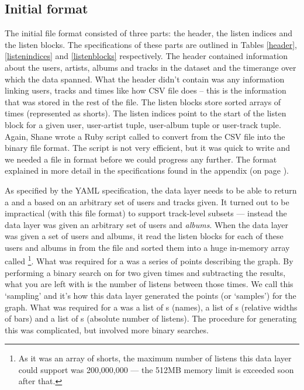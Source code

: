 \subsection{Initial format}
The initial file format consisted of three parts: the header, the listen indices and the listen blocks. The specifications of these parts are outlined in Tables \ref{header}, \ref{listenindices} and \ref{listenblocks} respectively. The header contained information about the users, artists, albums and tracks in the dataset and the timerange over which the data spanned. What the header didn't contain was any information linking users, tracks and times like how CSV file does -- this is the information that was stored in the rest of the file. The listen blocks store sorted arrays of times (represented as shorts). The listen indices point to the start of the listen block for a given user, user-artist tuple, user-album tuple or user-track tuple. Again, Shane wrote a Ruby script called  to convert from the CSV file into the binary file format\cite{bin}. The script is not very efficient, but it was quick to write and we needed a file in  format before we could progress any further. The format explained in more detail in the specifications found in the appendix (on page \pageref{appendix}).

As specified by the YAML specification, the data layer needs to be able to return a  and a  based on an arbitrary set of users and tracks given. It turned out to be impractical (with this file format) to support track-level subsets --- instead the data layer was given an arbitrary set of users and \emph{albums}. When the data layer was given a set of users and albums, it read the listen blocks for each of these users and albums in from the file and sorted them into a huge in-memory array called \footnote{As it was an array of shorts, the maximum number of listens this data layer could support was 200,000,000 --- the 512MB memory limit is exceeded soon after that.}. What was required for a  was a series of points describing the graph. By performing a binary search on  for two given times and subtracting the results, what you are left with is the number of listens between those times. We call this `sampling' and it's how this data layer generated the points (or `samples') for the graph. What was required for a  was a list of s (names), a list of s (relative widths of bars) and a list of s (absolute number of listens). The procedure for generating this was complicated, but involved more binary searches.\cite{olddata}

